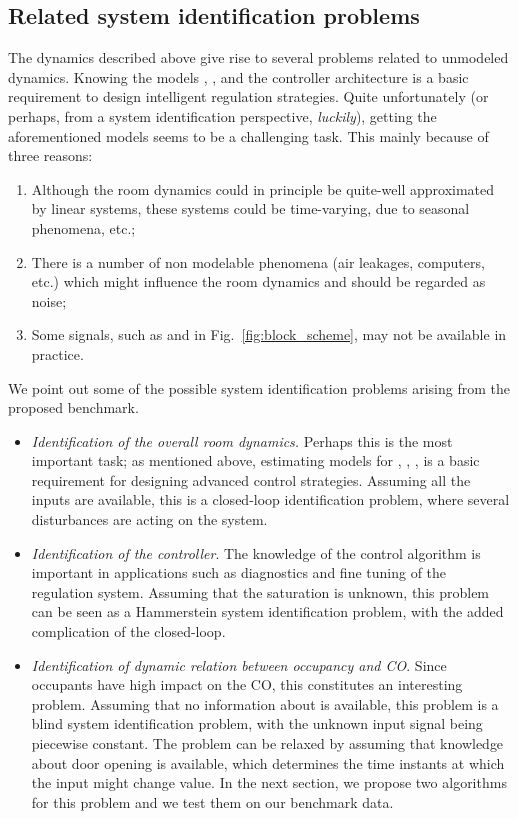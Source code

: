 \documentclass{article}
\begin{document}
\subsection{Related system identification problems}
The dynamics described above give rise to several problems related to unmodeled
dynamics. Knowing the models , ,  and the controller
architecture is a basic requirement to design intelligent regulation
strategies. Quite unfortunately (or perhaps, from a system identification
perspective, \emph{luckily}), getting the aforementioned models seems to be a
challenging task. This mainly because of three reasons:
\begin{enumerate}
\item Although the room dynamics could in principle be quite-well approximated by linear systems, these systems could be time-varying, due to seasonal phenomena, etc.;
\item There is a number of non modelable phenomena (air leakages, computers, etc.) which might influence the room dynamics and should be regarded as noise;
\item Some signals, such as  and  in
  Fig.~\ref{fig:block_scheme}, may not be available in practice.
\end{enumerate}
We point out some of the possible system identification problems arising from
the proposed benchmark.
\begin{itemize}
\item \emph{Identification of the overall room dynamics.} Perhaps this is the
  most important task; as mentioned above, estimating models for , ,
  , is a basic requirement for designing advanced control strategies.
  Assuming all the inputs are available, this is a closed-loop identification
  problem, where several disturbances are acting on the system.
\item \emph{Identification of the controller}. The knowledge of the control
  algorithm is important in applications such as diagnostics and fine tuning of
  the regulation system. Assuming that the saturation is unknown, this problem
  can be seen as a Hammerstein system identification problem, with the added
  complication of the closed-loop.
\item \emph{Identification of dynamic relation between occupancy and CO}.
  Since occupants have high impact on the CO, this constitutes an
  interesting problem. Assuming that no information about  is available,
  this problem is a blind system identification problem, with the unknown input
  signal being piecewise constant. The problem can be relaxed by assuming that
  knowledge about door opening is available, which determines the time instants
  at which the input might change value. In the next section, we propose two
  algorithms for this problem and we test them on our benchmark data.
\end{itemize}
\end{document}
